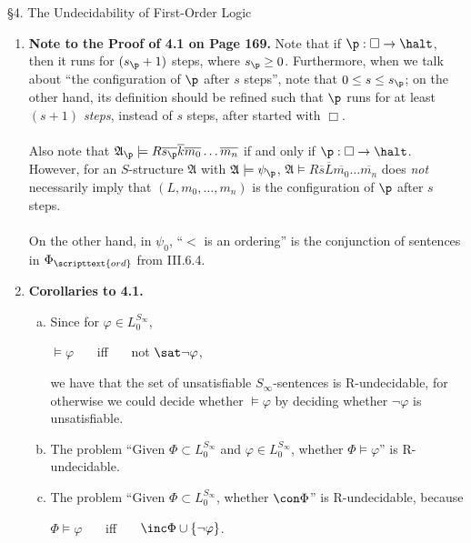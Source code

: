 \
\\
\\
{\large \S4. The Undecidability of First-Order Logic}
\begin{enumerate}[1.]
\item \textbf{Note to the Proof of 4.1 on Page 169.} Note that if $\p : \Box \to \halt$, then it runs for $(s_\p + 1)$ steps, where $s_\p \geq 0$. Furthermore, when we talk about ``the configuration of $\p$ after $s$ steps'', note that $0 \leq s \leq s_\p$; on the other hand, its definition should be refined such that $\p$ runs for at least \emph{$(s + 1)$ steps}, instead of $s$ steps, after started with $\Box$. \\
\ \\
Also note that $\mathfrak{A}_\p \models R \overline{s_\p} \overline{k} \overline{m_0} \ldots \overline{m_n}$ if and only if $\p : \Box \to \halt$. However, for an $S$-structure $\mathfrak{A}$ with $\mathfrak{A} \models \psi_\p$, $\mathfrak{A} \models R \overline{s} \overline{L} \overline{m_0} \ldots \overline{m_n}$ does \emph{not} necessarily imply that $(L, m_0, \ldots, m_n)$ is the configuration of $\p$ after $s$ steps.\\
\ \\
On the other hand, in $\psi_0$, ``$<$ is an ordering'' is the conjunction of sentences in $\Phi_\scripttext{ord}$ from III.6.4.
%
\item \textbf{Corollaries to 4.1.} 
\begin{enumerate}[(a)]
\item Since for $\varphi \in L_0^{S_\infty}$,
\begin{center}
$\models \varphi$ \ \ \ iff \ \ \ not $\sat \neg \varphi$,
\end{center}
we have that the set of unsatisfiable $S_\infty$-sentences is R-undecidable, for otherwise we could decide whether $\models \varphi$ by deciding whether $\neg \varphi$ is unsatisfiable.
\item The problem ``Given $\Phi \subset L_0^{S_\infty}$ and $\varphi \in L_0^{S_\infty}$, whether $\Phi \models \varphi$'' is R-undecidable.
\item The problem ``Given $\Phi \subset L_0^{S_\infty}$, whether $\con \Phi$'' is R-undecidable, because
\begin{center}
$\Phi \models \varphi$ \ \ \ iff \ \ \ $\inc \Phi \cup \{ \neg\varphi \}$.

\end{center}
\end{enumerate}
\end{enumerate}
